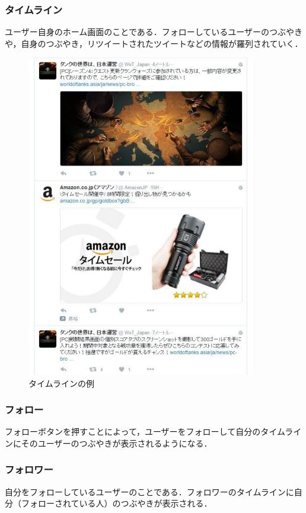 \subsubsection*{タイムライン}
ユーザー自身のホーム画面のことである．フォローしているユーザーのつぶやきや，自身のつぶやき，リツイートされたツイートなどの情報が羅列されていく．
\begin{figure}[htb]
\centering
\includegraphics[width=10cm]{taimurain.pdf}
\caption{タイムラインの例}\label{ace}
\end{figure}


\clearpage
\subsubsection*{フォロー}
フォローボタンを押すことによって，ユーザーをフォローして自分のタイムラインにそのユーザーのつぶやきが表示されるようになる．



\subsubsection*{フォロワー}
自分をフォローしているユーザーのことである．フォロワーのタイムラインに自分（フォローされている人）のつぶやきが表示される．


